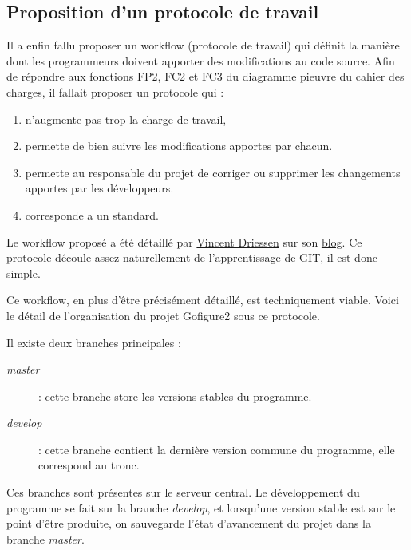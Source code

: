 \subsection{Proposition d'un protocole de travail}
Il a enfin fallu proposer un workflow (protocole de travail) 
qui définit la manière dont les programmeurs
doivent apporter des modifications au code source.
Afin de répondre aux fonctions FP2, FC2 et FC3 du diagramme pieuvre du cahier des charges, il fallait proposer un protocole qui :
\begin{enumerate}
  \item n'augmente pas trop la charge de travail,
  \item permette de bien suivre les modifications apportes par chacun. 
  \item permette au responsable du projet de corriger ou supprimer les changements apportes par les développeurs.
  \item corresponde a un standard.
\end{enumerate}
Le workflow proposé a été détaillé par \href{http://nvie.com/about }{Vincent Driessen} sur son \href{http://nvie.com/git-model}{blog}.
Ce protocole découle assez naturellement de l'apprentissage de GIT, il est donc simple.


Ce workflow, en plus d'être précisément détaillé, est techniquement viable. 
Voici le détail de l'organisation du projet Gofigure2 sous ce protocole.

Il existe deux branches principales : 
\begin{description}
  \item[\emph{master}] : cette branche store les versions stables du programme.
  \item[\emph{develop}] : cette branche contient la dernière version commune du programme, elle correspond au tronc.
\end{description}
Ces branches sont présentes sur le serveur central. Le développement du programme se fait sur la branche \emph{develop}, et lorsqu'une version stable est sur le point d'être produite, on sauvegarde l'état d'avancement du projet dans la branche \emph{master}.

